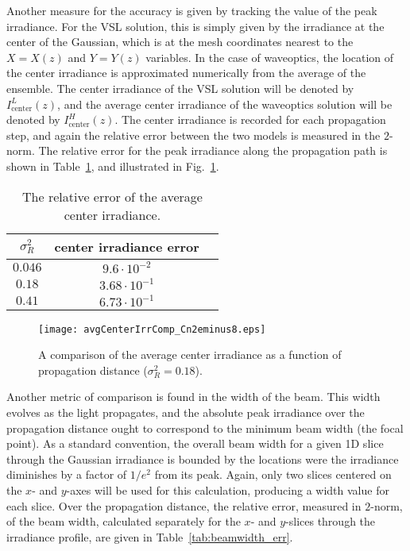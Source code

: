 \documentclass[9pt,twocolumn,twoside]{osajnl}
\newcommand{\norm}[1]{\left\lVert#1\right\rVert}
\begin{document}
Another measure for the accuracy is given by tracking the value of the peak irradiance. For the VSL solution, this is simply given by the irradiance at the center of the Gaussian, which is at the mesh coordinates nearest to the $X = X(z)$ and $Y = Y(z)$ variables.  In the case of waveoptics, the location of the center irradiance is approximated numerically from the average of the ensemble.  The center irradiance of the VSL solution will be denoted by $I^{L}_\text{center}(z)$, and the average center irradiance of the waveoptics solution will be denoted by $I^{H}_\text{center}(z)$.  The center irradiance is recorded for each propagation step, and again the relative error between the two models is measured in the $2$-norm.
The relative error for the peak irradiance along the propagation path is shown in Table~\ref{tab:avgcenterirr_errs}, and illustrated in Fig.~\ref{fig:centerirrcomp}. 

\begin{table}[b!]
	\centering \vspace*{-3mm}
	\caption{The relative error of the average center irradiance.} \label{tab:avgcenterirr_errs}
	\begin{tabular}{ccc}
		\hline
		$\sigma_{R}^{2}$  	& center irradiance error  \\ 
		\hline
		$0.046$ 	& $9.6 \cdot 10^{-2}$ \\
		$0.18$	    &  $3.68 \cdot 10^{-1}$ \\
		$0.41$      & $6.73 \cdot 10^{-1}$ \\
		\hline
	\end{tabular}
\end{table}


\begin{figure}[t!]
	\centering
	\texttt{[image: avgCenterIrrComp\_Cn2eminus8.eps]} 
	\vspace{-3mm}
	\caption{A comparison of the average center irradiance as a function of propagation distance ($\sigma_{R}^{2} = 0.18$).}\label{fig:centerirrcomp} \vspace*{-3mm}
\end{figure}

Another metric of comparison is found in the width of the beam.
This width evolves as the light propagates, and the absolute peak irradiance over the  propagation distance ought to correspond to the minimum beam width (the focal point). 
As a standard convention, the overall beam width for a given 1D slice through the Gaussian irradiance is bounded by the locations were the irradiance diminishes by a factor of $1/e^2$ from its peak.  
Again, only two slices centered on the $x$- and $y$-axes will be used for this calculation, producing a width value for each slice. 
Over the propagation distance, the relative error, measured in $2$-norm, of the beam width, calculated separately for the $x$- and $y$-slices through the irradiance profile, are given in Table~\ref{tab:beamwidth_err}.
\end{document}

